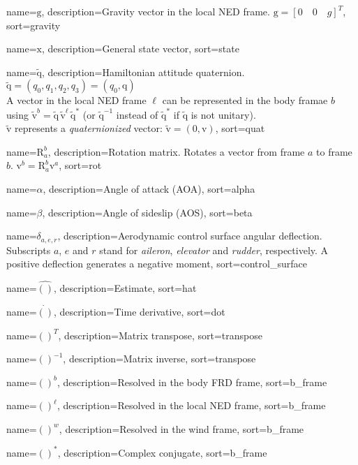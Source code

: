 {
	name={$\bm{\mathrm{g}}$},
	description={Gravity vector in the local NED frame. $\bm{\mathrm{g}} = [0 \quad 0 \quad g]^T$},
	sort=gravity
}

{
	name={$\bm{\mathrm{x}}$},
	description={General state vector},
	sort=state
}

{
	name={$\bm{\mathrm{\tilde{q}}}$},
	description={Hamiltonian attitude quaternion.
	$\bm{\mathrm{\tilde{q}}} = (q_0, q_1, q_2, q_3) = (q_0, \bm{\mathrm{q}})$\\
	A vector in the local NED frame $\ell$ can be represented in the body framae $b$ using $\bm{\mathrm{\tilde{v}}}^b = \bm{\mathrm{\tilde{q}}} \, \bm{\mathrm{\tilde{v}}}^\ell \, \bm{\mathrm{\tilde{q}}}^*$ (or $\bm{\mathrm{\tilde{q}}}^{-1}$ instead of $\bm{\mathrm{\tilde{q}}}^*$ if $\bm{\mathrm{\tilde{q}}}$ is not unitary).\\
	$\bm{\mathrm{\tilde{v}}}$ represents a \textit{quaternionized} vector: $\bm{\mathrm{\tilde{v}}} = (0,\bm{\mathrm{v}})$},
	sort=quat
}

{
	name={$\bm{\mathrm{R}}_a^b$},
	description={Rotation matrix. Rotates a vector from frame $a$ to frame $b$. $\bm{\mathrm{v}}^b = \bm{\mathrm{R}}_a^b \bm{\mathrm{v}}^a$},
	sort=rot
}

{
	name={$\alpha$},
	description={Angle of attack (AOA)},
	sort=alpha
}

{
	name={$\beta$},
	description={Angle of sideslip (AOS)},
	sort=beta
}

{
	name={$\delta_{a,e,r}$},
	description={Aerodynamic control surface angular deflection. Subscripts $a$, $e$ and $r$ stand for \textit{aileron}, \textit{elevator} and \textit{rudder}, respectively. A positive deflection generates a negative moment},
	sort=control_surface
}

{
	name={$\hat{()}$},
	description={Estimate},
	sort=hat
}

{
	name={$\dot{()}$},
	description={Time derivative},
	sort=dot
}

{
	name={$()^T$},
	description={Matrix transpose},
	sort=transpose
}

{
	name={$()^{-1}$},
	description={Matrix inverse},
	sort=transpose
}

{
	name={$()^b$},
	description={Resolved in the body FRD frame},
	sort=b_frame
}

{
	name={$()^\ell$},
	description={Resolved in the local NED frame},
	sort=b_frame
}

{
	name={$()^w$},
	description={Resolved in the wind frame},
	sort=b_frame
}

{
	name={$()^*$},
	description={Complex conjugate},
	sort=b_frame
}

